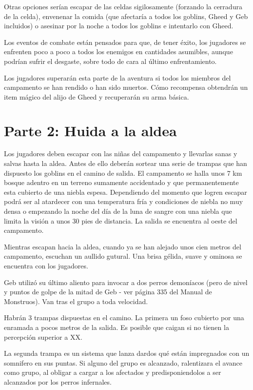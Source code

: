 \documentclass[10pt,twoside,twocolumn,openany]{dndbook}
\begin{document}
Otras opciones serían escapar de las celdas sigilosamente (forzando la cerradura de la celda), envenenar la comida (que afectaría a todos los goblins, Gheed y Geb incluidos) o asesinar por la noche a todos los goblins e intentarlo con Gheed. 

Los eventos de combate están pensados para que, de tener éxito, los jugadores se enfrenten poco a poco a todos los enemigos en cantidades asumibles, aunque podrían sufrir el desgaste, sobre todo de cara al último enfrentamiento.

Los jugadores superarán esta parte de la aventura si todos los miembros del campamento se han rendido o han sido muertos. Cómo recompensa obtendrán un item mágico del alijo de Gheed y recuperarán su arma básica.


\section*{Parte 2: Huida a la aldea}

Los jugadores deben escapar con las niñas del campamento y llevarlas sanas y salvas hasta la aldea. Antes de ello deberán sortear una serie de trampas que han dispuesto los goblins en el camino de salida. El campamento se halla unos 7 km bosque adentro en un terreno sumamente accidentado y que permanentemente esta cubierto de una niebla espesa. Dependiendo del momento que logren escapar podrá ser al atardecer con una temperatura fría y condiciones de niebla no muy densa o empezando la noche del día de la luna de sangre con una niebla que limita la visión a unos 30 pies de distancia. La salida se encuentra al oeste del campamento.

\begin{DndReadAloud}
Mientras escapan hacia la aldea, cuando ya se han alejado unos cien metros del campamento, escuchan un aullido gutural. Una brisa gélida, suave y ominosa se encuentra con los jugadores.
\end{DndReadAloud}

Geb utilizó su último aliento para invocar a dos perros demoníacos (pero de nivel y puntos de golpe de la mitad de Geb - ver página 335 del Manual de Monstruos). Van tras el grupo a toda velocidad.

Habrán 3 trampas dispuestas en el camino. La primera un foso cubierto por una enramada a pocos metros de la salida. Es posible que caigan si no tienen la percepción superior a XX.

La segunda trampa es un sistema que lanza dardos qué están impregnados con un somnifero en sus puntas. Si alguno del grupo es alcanzado, ralentizara el avance como grupo, al obligar a cargar a los afectados y predisponiendolos a ser alcanzados por los perros infernales.
\end{document}
